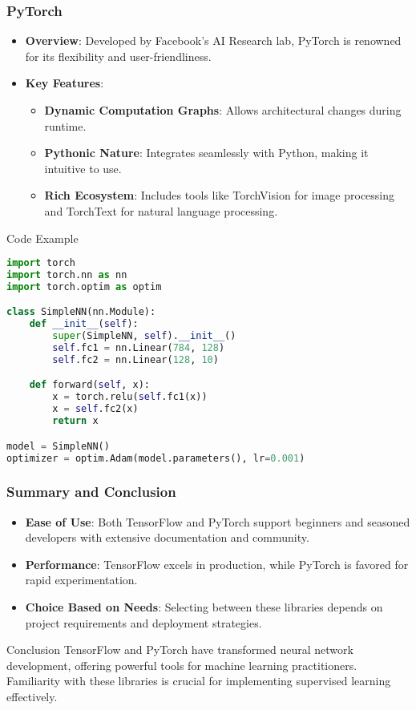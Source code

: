 \documentclass[aspectratio=169]{beamer}
\begin{document}
\begin{frame}[fragile]
    \frametitle{PyTorch}
    \begin{itemize}
        \item \textbf{Overview}: Developed by Facebook's AI Research lab, PyTorch is renowned for its flexibility and user-friendliness.
        \item \textbf{Key Features}:
            \begin{itemize}
                \item \textbf{Dynamic Computation Graphs}: Allows architectural changes during runtime.
                \item \textbf{Pythonic Nature}: Integrates seamlessly with Python, making it intuitive to use.
                \item \textbf{Rich Ecosystem}: Includes tools like TorchVision for image processing and TorchText for natural language processing.
            \end{itemize}
    \end{itemize}
    \begin{block}{Code Example}
        \begin{lstlisting}[language=Python]
import torch
import torch.nn as nn
import torch.optim as optim

class SimpleNN(nn.Module):
    def __init__(self):
        super(SimpleNN, self).__init__()
        self.fc1 = nn.Linear(784, 128)
        self.fc2 = nn.Linear(128, 10)

    def forward(self, x):
        x = torch.relu(self.fc1(x))
        x = self.fc2(x)
        return x

model = SimpleNN()
optimizer = optim.Adam(model.parameters(), lr=0.001)
        \end{lstlisting}
    \end{block}
\end{frame}

\begin{frame}
    \frametitle{Summary and Conclusion}
    \begin{itemize}
        \item \textbf{Ease of Use}: Both TensorFlow and PyTorch support beginners and seasoned developers with extensive documentation and community.
        \item \textbf{Performance}: TensorFlow excels in production, while PyTorch is favored for rapid experimentation.
        \item \textbf{Choice Based on Needs}: Selecting between these libraries depends on project requirements and deployment strategies.
    \end{itemize}
    \begin{block}{Conclusion}
        TensorFlow and PyTorch have transformed neural network development, offering powerful tools for machine learning practitioners. Familiarity with these libraries is crucial for implementing supervised learning effectively.
    \end{block}
\end{frame}
\end{document}
